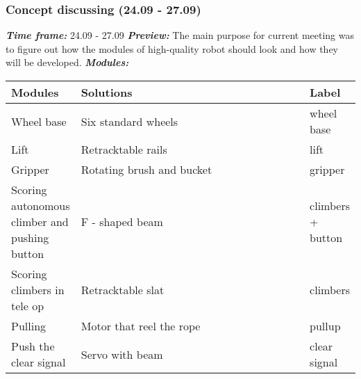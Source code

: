\addtocounter{number_of_meeting}{1}
\subsubsection{Concept discussing (24.09 - 27.09)}
\textit{\textbf{Time frame:}} 24.09 - 27.09 \newline
\textit{\textbf{Preview:}} The main purpose for current meeting was to figure out how the modules of high-quality robot should look and how they will be developed. \newline \newline
\textit{\textbf{Modules:}}

\begin{table}[H]
	\vspace{-2mm}
	\begin{center}
		\begin{tabular}{|p{0.2\linewidth}|p{0.7\linewidth}|p{0.1\linewidth}|}
			\hline
			Modules & Solutions & Label \\
			\hline
			Wheel base & Six standard wheels & wheel base \\
			\hline
			Lift & Retracktable rails & lift \\
			\hline
			Gripper & Rotating brush and bucket & gripper\\
			\hline
			Scoring autonomous climber and pushing button & F - shaped beam & climbers + button\\
			\hline
			Scoring climbers in tele op & Retracktable slat & climbers\\
			\hline
			Pulling & Motor that reel the rope & pullup\\
			\hline
			Push the clear signal & Servo with beam & clear signal\\
			\hline
		\end{tabular}
	\end{center}
\end{table}

